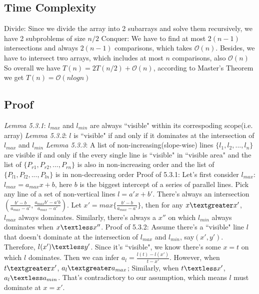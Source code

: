 \documentclass[11pt]{article}
\renewcommand{\O}{\mathcal{O}}
\begin{document}
\subsection{Time Complexity}
	Divide: Since we divide the array into 2 subarrays and solve them recursively, we have 2 subproblems of size $n/2$\newline
	Conquer: We have to find at most $2(n-1)$ intersections and always $2(n-1)$ comparisons, which takes $\O(n)$. Besides, we have to intersect two arrays, which includes at most $n$ comparisons, also $\O(n)$\newline
	So overall we have $T(n) = 2T(n/2) + \O(n)$, according to Master's Theorem we get $T(n) = \O(nlogn)$
\subsection{Proof}
	\emph{Lemma 5.3.1}: $l_{max}$ and $l_{min}$ are always ``visible" within its correspoding scope(i.e. array)\newline
	\emph{Lemma 5.3.2}: $l$ is ``visible" if and only if it dominates at the intersection of $l_{max}$ and $l_{min}$\newline
	\emph{Lemma 5.3.3}: A list of non-increasing(slope-wise) lines $\{l_{1}, l_{2}, ..., l_{n}\}$ are visible if and only if the every single line is ``visible" in ``visible area" and the list of $\{P_{r1}, P_{r2}, ...,  P_{rn}\}$ is also in non-increasing order and the list of $\{P_{l1}, P_{l2}, ...,  P_{ln}\}$ is in non-decreasing order\newline
	\newline
	Proof of 5.3.1: Let's first consider $l_{max}$: $l_{max}=a_{max}x+b$, here $b$ is the biggest intercept of a series of parallel lines. Pick any line of a set of non-vertical lines $l=a'x+b'$. There's always an intersection $(\frac{b'-b}{a_{max}-a'}, \frac{a_{max}b'-a'b}{a_{max}-a'})$. Let $x'=max\{\frac{b'-b}{a_{max}-a'}\}$, then for any $x\textgreater x'$, $l_{max}$ always dominates. Similarly, there's always a $x''$ on which $l_{min}$ always dominates when $x\textless x''$.\newline
	\newline
	Proof of 5.3.2: Assume there's a ``visible" line $l$ that doesn't dominate at the intersection of $l_{max}$ and $l_{min}$, say$(x', y')$. Therefore, $l(x')\textless y'$. Since it's ``visible", we know there's some $x=t$ on which $l$ dominates. Then we can infer $a_{l}=\frac{l(t)-l(x')}{t-x'}$. However, when $t\textgreater x'$, $a_{l}\textgreater a_{max}$; Similarly, when $t\textless x'$, $a_{l}\textless a_{min}$. That's contradictory to our assumption, which means $l$ must dominate at $x=x'$.\newline
\end{document}
